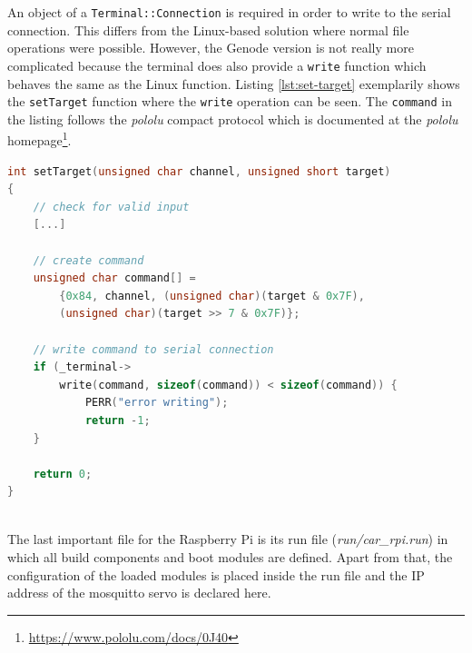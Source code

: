 An object of a \texttt{Terminal::Connection} is required in order to write to the serial connection. This differs from the Linux-based solution where normal file operations were possible. However, the Genode version is not really more complicated because the terminal does also provide a \texttt{write} function which behaves the same as the Linux function. Listing \ref{lst:set-target} exemplarily shows the \texttt{setTarget} function where the \texttt{write} operation can be seen. The \texttt{command} in the listing follows the \textit{pololu} compact protocol which is documented at the \textit{pololu} homepage\footnote{\url{https://www.pololu.com/docs/0J40}}. \\

\begin{minipage}{\linewidth}
\begin{lstlisting}[style=mylistings, language=c, label=lst:set-target, caption=setTarget function of the servo component]
int setTarget(unsigned char channel, unsigned short target)
{
    // check for valid input
    [...]

    // create command
    unsigned char command[] = 
        {0x84, channel, (unsigned char)(target & 0x7F), 
        (unsigned char)(target >> 7 & 0x7F)}; 

    // write command to serial connection
    if (_terminal->
        write(command, sizeof(command)) < sizeof(command)) {
            PERR("error writing");
            return -1; 
    }
    
    return 0;
}
\end{lstlisting}
\end{minipage} \\

The last important file for the Raspberry Pi is its run file (\textit{run/car\_rpi.run}) in which all build components and boot modules are defined. Apart from that, the configuration of the loaded modules is placed inside the run file and the IP address of the mosquitto servo is declared here.

